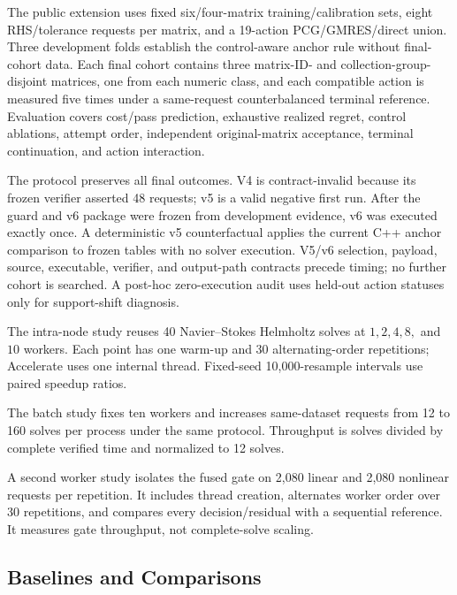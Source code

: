 The public extension uses fixed six/four-matrix training/calibration sets, eight
RHS/tolerance requests per matrix, and a 19-action PCG/GMRES/direct union. Three
development folds establish the control-aware anchor rule without final-cohort data.
Each final cohort contains three matrix-ID- and collection-group-disjoint matrices,
one from each numeric class, and each compatible action is measured five times under
a same-request counterbalanced terminal reference. Evaluation covers cost/pass
prediction, exhaustive realized regret, control ablations, attempt order,
independent original-matrix acceptance, terminal continuation, and action interaction.

The protocol preserves all final outcomes. V4 is contract-invalid because its frozen
verifier asserted 48 requests; v5 is a valid negative first run. After the guard and
v6 package were frozen from development evidence, v6 was executed exactly once. A
deterministic v5 counterfactual applies the current C++ anchor comparison to frozen
tables with no solver execution. V5/v6 selection, payload, source, executable,
verifier, and output-path contracts precede timing; no further cohort is searched. A
post-hoc zero-execution audit uses held-out action statuses only for support-shift diagnosis.

The intra-node study reuses 40 Navier--Stokes Helmholtz solves at $1,2,4,8,$ and
$10$ workers. Each point has one warm-up and 30 alternating-order repetitions;
Accelerate uses one internal thread. Fixed-seed 10,000-resample intervals use paired
speedup ratios.

The batch study fixes ten workers and increases same-dataset requests from 12 to 160
solves per process under the same protocol. Throughput is solves divided by complete
verified time and normalized to 12 solves.

A second worker study isolates the fused gate on 2,080 linear and 2,080 nonlinear
requests per repetition. It includes thread creation, alternates worker order over 30
repetitions, and compares every decision/residual with a sequential reference. It
measures gate throughput, not complete-solve scaling.

\subsection{Baselines and Comparisons}

